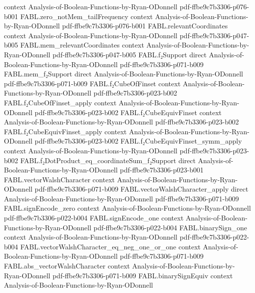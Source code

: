 \begin{theorem}
  {context}
  {Analysis-of-Boolean-Functions-by-Ryan-ODonnell}
  {pdf-ffbe9c7b3306-p076-b001}
\proofstep
  {FABL.zero_notMem_tailFrequency}
  {context}
  {Analysis-of-Boolean-Functions-by-Ryan-ODonnell}
  {pdf-ffbe9c7b3306-p076-b001}
\proofstep
  {FABL.relevantCoordinates}
  {context}
  {Analysis-of-Boolean-Functions-by-Ryan-ODonnell}
  {pdf-ffbe9c7b3306-p047-b005}
\proofstep
  {FABL.mem_relevantCoordinates}
  {context}
  {Analysis-of-Boolean-Functions-by-Ryan-ODonnell}
  {pdf-ffbe9c7b3306-p047-b005}
\proofstep
  {FABL.f₂Support}
  {direct}
  {Analysis-of-Boolean-Functions-by-Ryan-ODonnell}
  {pdf-ffbe9c7b3306-p071-b009}
\proofstep
  {FABL.mem_f₂Support}
  {direct}
  {Analysis-of-Boolean-Functions-by-Ryan-ODonnell}
  {pdf-ffbe9c7b3306-p071-b009}
\proofstep
  {FABL.f₂CubeOfFinset}
  {context}
  {Analysis-of-Boolean-Functions-by-Ryan-ODonnell}
  {pdf-ffbe9c7b3306-p023-b002}
\proofstep
  {FABL.f₂CubeOfFinset_apply}
  {context}
  {Analysis-of-Boolean-Functions-by-Ryan-ODonnell}
  {pdf-ffbe9c7b3306-p023-b002}
\proofstep
  {FABL.f₂CubeEquivFinset}
  {context}
  {Analysis-of-Boolean-Functions-by-Ryan-ODonnell}
  {pdf-ffbe9c7b3306-p023-b002}
\proofstep
  {FABL.f₂CubeEquivFinset_apply}
  {context}
  {Analysis-of-Boolean-Functions-by-Ryan-ODonnell}
  {pdf-ffbe9c7b3306-p023-b002}
\proofstep
  {FABL.f₂CubeEquivFinset_symm_apply}
  {context}
  {Analysis-of-Boolean-Functions-by-Ryan-ODonnell}
  {pdf-ffbe9c7b3306-p023-b002}
\proofstep
  {FABL.f₂DotProduct_eq_coordinateSum_f₂Support}
  {direct}
  {Analysis-of-Boolean-Functions-by-Ryan-ODonnell}
  {pdf-ffbe9c7b3306-p023-b001}
\proofstep
  {FABL.vectorWalshCharacter}
  {context}
  {Analysis-of-Boolean-Functions-by-Ryan-ODonnell}
  {pdf-ffbe9c7b3306-p071-b009}
\proofstep
  {FABL.vectorWalshCharacter_apply}
  {direct}
  {Analysis-of-Boolean-Functions-by-Ryan-ODonnell}
  {pdf-ffbe9c7b3306-p071-b009}
\proofstep
  {FABL.signEncode_zero}
  {context}
  {Analysis-of-Boolean-Functions-by-Ryan-ODonnell}
  {pdf-ffbe9c7b3306-p022-b004}
\proofstep
  {FABL.signEncode_one}
  {context}
  {Analysis-of-Boolean-Functions-by-Ryan-ODonnell}
  {pdf-ffbe9c7b3306-p022-b004}
\proofstep
  {FABL.binarySign_one}
  {context}
  {Analysis-of-Boolean-Functions-by-Ryan-ODonnell}
  {pdf-ffbe9c7b3306-p022-b004}
\proofstep
  {FABL.vectorWalshCharacter_eq_neg_one_or_one}
  {context}
  {Analysis-of-Boolean-Functions-by-Ryan-ODonnell}
  {pdf-ffbe9c7b3306-p071-b009}
\proofstep
  {FABL.abs_vectorWalshCharacter}
  {context}
  {Analysis-of-Boolean-Functions-by-Ryan-ODonnell}
  {pdf-ffbe9c7b3306-p071-b009}
\proofstep
  {FABL.binarySignEquiv}
  {context}
  {Analysis-of-Boolean-Functions-by-Ryan-ODonnell}

\end{theorem}
